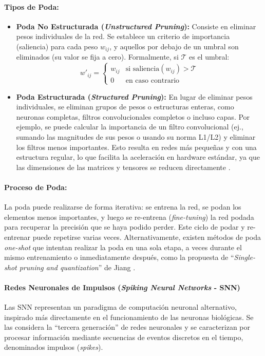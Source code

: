\documentclass[12pt]{article}
\begin{document}
\paragraph{Tipos de Poda:}
\begin{itemize}
    \item \textbf{Poda No Estructurada (\textit{Unstructured Pruning}):} Consiste en eliminar pesos individuales de la red. Se establece un criterio de importancia (saliencia) para cada peso $w_{ij}$, y aquellos por debajo de un umbral son eliminados (su valor se fija a cero). Formalmente, si $\mathcal{T}$ es el umbral:
    \begin{equation}
    w'_{ij} = \begin{cases} w_{ij} & \text{si } \text{saliencia}(w_{ij}) > \mathcal{T} \\ 0 & \text{en caso contrario} \end{cases}
    \label{eq:poda_no_estructurada}
    \end{equation}
    \item \textbf{Poda Estructurada (\textit{Structured Pruning}):} En lugar de eliminar pesos individuales, se eliminan grupos de pesos o estructuras enteras, como neuronas completas, filtros convolucionales completos o incluso capas. Por ejemplo, se puede calcular la importancia de un filtro convolucional (ej., sumando las magnitudes de sus pesos o usando su norma L1/L2) y eliminar los filtros menos importantes. Esto resulta en redes más pequeñas y con una estructura regular, lo que facilita la aceleración en hardware estándar, ya que las dimensiones de las matrices y tensores se reducen directamente \cite{Liang2021PruningSurvey}.
\end{itemize}

\paragraph{Proceso de Poda:}
La poda puede realizarse de forma iterativa: se entrena la red, se podan los elementos menos importantes, y luego se re-entrena (\textit{fine-tuning}) la red podada para recuperar la precisión que se haya podido perder. Este ciclo de podar y re-entrenar puede repetirse varias veces. Alternativamente, existen métodos de poda \textit{one-shot} que intentan realizar la poda en una sola etapa, a veces durante el mismo entrenamiento o inmediatamente después, como la propuesta de ``\textit{Single-shot pruning and quantization}'' de Jiang \cite{Jiang2023SingleShot}.

\paragraph{Redes Neuronales de Impulsos (\textit{Spiking Neural Networks} - SNN)}
\label{sssec:snn_exp}
Las SNN representan un paradigma de computación neuronal alternativo, inspirado más directamente en el funcionamiento de las neuronas biológicas. Se las considera la ``tercera generación'' de redes neuronales y se caracterizan por procesar información mediante secuencias de eventos discretos en el tiempo, denominados impulsos (\textit{spikes}).
\end{document}
